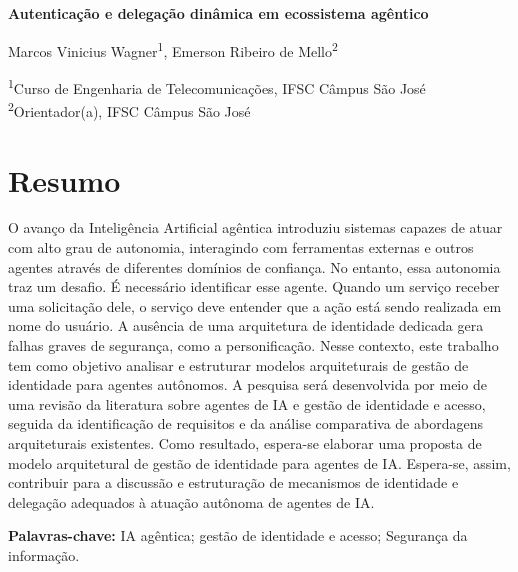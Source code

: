 \documentclass[11pt]{../../modelos-latex/classes/ifscarticle}
\begin{document}
\begin{center}
	{\Large \textbf{Autenticação e delegação dinâmica em ecossistema agêntico
}}\vspace{.3cm}

	Marcos Vinicius Wagner\textsuperscript{1}, Emerson Ribeiro de Mello\textsuperscript{2}

	\vspace{.2cm}
	{\small
	\textsuperscript{1}Curso de Engenharia de Telecomunicações, IFSC Câmpus São José\\
	\textsuperscript{2}Orientador(a), IFSC Câmpus São José
	}
\end{center}

\vspace{.5cm}

\section*{Resumo}
O avanço da Inteligência Artificial agêntica introduziu sistemas capazes de atuar com alto grau de autonomia, interagindo com ferramentas externas e outros agentes através de diferentes domínios de confiança. No entanto, essa autonomia traz um desafio. É necessário identificar esse agente. Quando um serviço receber uma solicitação dele, o serviço deve entender que a ação está sendo realizada em nome do usuário. A ausência de uma arquitetura de identidade dedicada gera falhas graves de segurança, como a personificação. Nesse contexto, este trabalho tem como objetivo analisar e estruturar modelos arquiteturais de gestão de identidade para agentes autônomos. A pesquisa será desenvolvida por meio de uma revisão da literatura sobre agentes de IA e gestão de identidade e acesso, seguida da identificação de requisitos e da análise comparativa de abordagens arquiteturais existentes. Como resultado, espera-se elaborar uma proposta de modelo arquitetural de gestão de identidade para agentes de IA. Espera-se, assim, contribuir para a discussão e estruturação de mecanismos de identidade e delegação adequados à atuação autônoma de agentes de IA.

\noindent\textbf{Palavras-chave:} IA agêntica; gestão de identidade e acesso; Segurança da informação.
\end{document}
